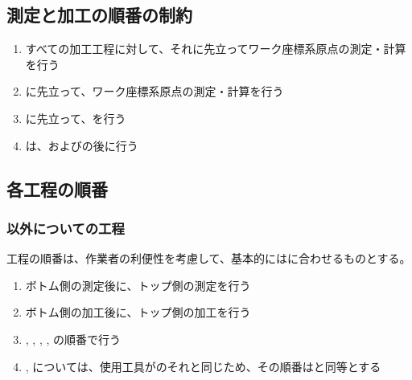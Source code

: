 






\subsection{測定と加工の順番の制約}
\begin{enumerate}[label={\sarrow}]
\item すべての加工工程に対して、それに先立ってワーク座標系原点の測定・計算を行う
\item \DimpleMeasurement に先立って、ワーク座標系原点の測定・計算を行う
\item \DimpleMilling に先立って、\DimpleMeasurement を行う
\item \CenterlineEndFaceDifMeasurement は、\TopOutcutMilling および\BottomOutcutMilling の後に行う
\end{enumerate}


\subsection{各工程の順番}

\subsubsection{\DimpleMilling 以外についての工程}
工程の順番は、作業者の利便性を考慮して、基本的には\MMC に合わせるものとする。
\begin{enumerate}[label={\sarrow}]
\item ボトム側の測定後に、トップ側の測定を行う
\item ボトム側の加工後に、トップ側の加工を行う
\item \EndFacecutMilling, \OutcutMilling, \KeywayMilling, \EndFaceOutCChamferMilling, \EndFaceInCChamferMilling の順番で行う
\item \EndFaceBoringMilling, \IncutBoringMilling については、使用工具が\OutcutMilling のそれと同じため、その順番は\TopOutcutMilling と同等とする
\end{enumerate}

